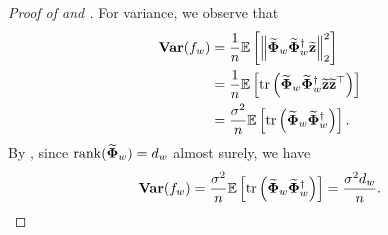 \begin{proof}[Proof of  and ]
    For variance, we observe that 
    \begin{align*}
        \vari(f_w) &= \frac{1}{n} \E\sbr{\nbr{\wt\Phib_w \wt\Phib_w^\dagger \wt\zb}_2^2} \\
        &= \frac{1}{n} \E\sbr{\tr\rbr{\wt\Phib_w \wt\Phib_w^\dagger \wt\zb \wt\zb^\top}} \\
        &= \frac{\sigma^2}{n} \E\sbr{\tr\rbr{\wt\Phib_w \wt\Phib_w^\dagger}}.
    \end{align*}
    By , since $\rank(\wt\Phib_w) = d_w$ almost surely, we have
    \begin{align*}
        \vari(f_w) = \frac{\sigma^2}{n} \E\sbr{\tr\rbr{\wt\Phib_w \wt\Phib_w^\dagger}} = \frac{\sigma^2 d_w}{n}.
    \end{align*}
\end{proof}



